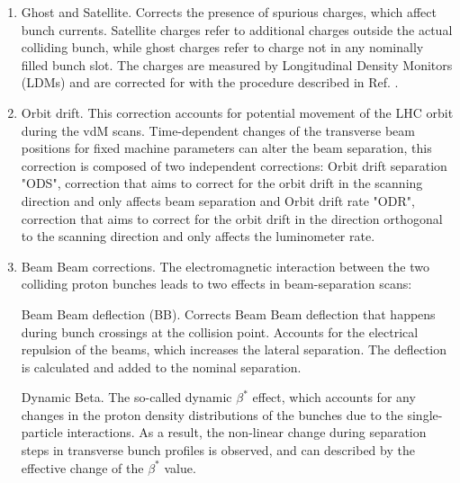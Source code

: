 \begin{enumerate}

\item Ghost and Satellite. Corrects the presence of spurious charges, which affect bunch currents. Satellite charges refer to additional charges outside the actual colliding bunch, while ghost charges refer to charge not in any nominally filled bunch slot. The charges are measured by Longitudinal Density Monitors (LDMs) \cite{ghost_charge} and are corrected for with the procedure described in Ref. \cite{lumi_precise_2015_2016}.%

\item Orbit drift. This correction accounts for potential movement of the LHC orbit during the vdM scans. Time-dependent changes of the transverse beam positions for fixed machine parameters can alter the beam separation, this correction is composed of two independent corrections: Orbit drift separation "ODS", correction that aims to correct for the orbit drift in the scanning direction and only affects beam separation and  Orbit drift rate "ODR", correction that aims to correct for the orbit drift in the direction orthogonal to the scanning direction and only affects the luminometer rate. 

\item Beam Beam corrections.  The electromagnetic interaction between the two colliding proton bunches leads to two effects in beam-separation scans:

Beam Beam deflection (BB). Corrects Beam Beam deflection that happens during bunch crossings at the collision point. Accounts for the electrical repulsion of the beams, which increases the lateral separation. The deflection is calculated and added to the nominal separation.

Dynamic Beta. The so-called dynamic $\beta^{*}$  effect, which accounts for any changes in the proton density distributions of the bunches due to the single-particle interactions. As a result, the non-linear change during separation steps in transverse bunch profiles is observed, and can described by the effective change of the $\beta^{*}$  value.


\end{enumerate}
